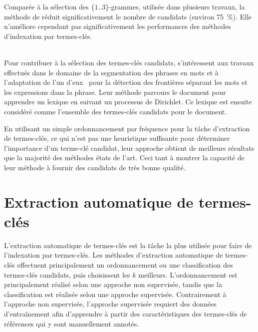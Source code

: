 
    Comparée à la sélection des $\{1..3\}$-grammes, utilisée dans plusieurs
    travaux, la méthode de  réduit
    significativement le nombre de candidats (environ 75~\%). Elle n'améliore
    cependant pas significativement les performances des méthodes d'indexation
    par termes-clés.

    ~\\Pour contribuer à la sélection des termes-clés candidats,
     s'intéressent aux travaux
    effectués dans le domaine de la segmentation des phrases en mots et à
    l'adaptation de l'un d'eux~\cite{goldwater2009bayesianwordsegmentation} pour
    la détection des frontières séparant les mots et les expressions dans la
    phrase. Leur méthode parcours le document pour apprendre un lexique en
    suivant un processus de Dirichlet. Ce lexique est ensuite considéré comme
    l'ensemble des termes-clés candidats pour le document.

    En utilisant un simple ordonnancement par fréquence pour la tâche
    d'extraction de termes-clés, ce qui n'est pas une heuristique suffisante
    pour déterminer l'importance d'un terme-clé candidat, leur approche obtient
    de meilleurs résultats que la majorité des méthodes états de l'art. Ceci
    tant à montrer la capacité de leur méthode à fournir des candidats de très
    bonne qualité.


  \section{Extraction automatique de termes-clés}
  \label{sec:main-state_of_the_art-automatic_keyphrase_extraction}
    L'extraction automatique de termes-clés est la tâche la plus utilisée pour
    faire de l'indexation par termes-clés. Les méthodes d'extraction automatique
    de termes-clés effectuent principalement un ordonnancement ou une
    classification des termes-clés candidats, puis choisissent les $k$
    meilleurs. L'ordonnancement est principalement réalisé selon une approche
    non supervisée, tandis que la classification est réalisée selon une approche
    supervisée. Contrairement à l'approche non supervisée, l'approche supervisée
    requiert des données d'entraînement afin d'apprendre à partir des
    caractéristiques des termes-clés de références qui y sont manuellement
    annotés.

